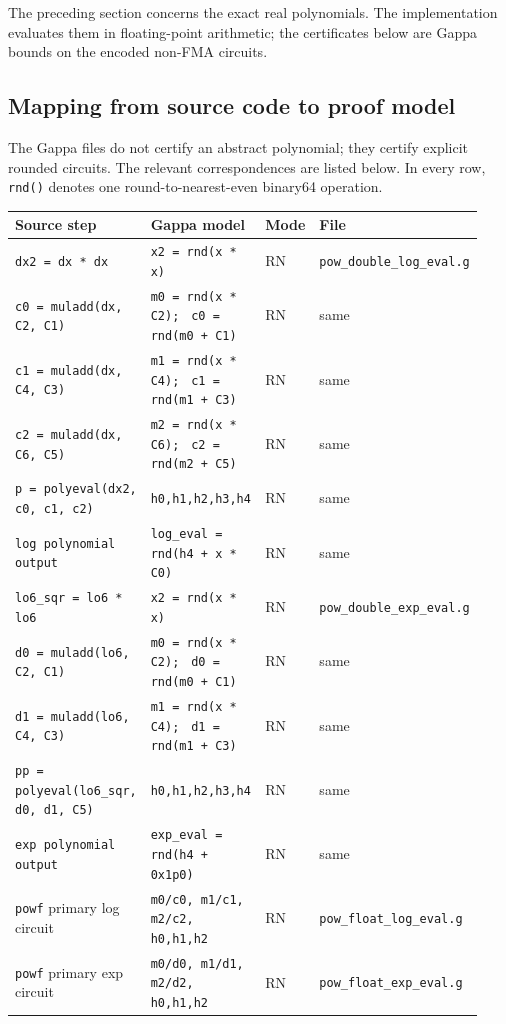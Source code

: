 \documentclass[11pt]{article}
\theoremstyle{plain}
\theoremstyle{remark}
\begin{document}
The preceding section concerns the exact real polynomials.  The implementation
evaluates them in floating-point arithmetic; the certificates below are Gappa
bounds on the encoded non-FMA circuits.

\subsection{Mapping from source code to proof model}

The Gappa files do not certify an abstract polynomial; they certify explicit
rounded circuits.  The relevant correspondences are listed below.  In every
row, \texttt{rnd()} denotes one round-to-nearest-even binary64 operation.

\begin{longtable}{@{}p{0.29\linewidth}p{0.41\linewidth}p{0.12\linewidth}p{0.11\linewidth}@{}}
\toprule
Source step & Gappa model & Mode & File \\
\midrule
\endhead
\texttt{dx2 = dx * dx}
  & \texttt{x2 = rnd(x * x)}
  & RN & \texttt{pow\_double\_log\_eval.g} \\[4pt]
\texttt{c0 = muladd(dx, C2, C1)}
  & \texttt{m0 = rnd(x * C2);} \texttt{ c0 = rnd(m0 + C1)}
  & RN & same \\[4pt]
\texttt{c1 = muladd(dx, C4, C3)}
  & \texttt{m1 = rnd(x * C4);} \texttt{ c1 = rnd(m1 + C3)}
  & RN & same \\[4pt]
\texttt{c2 = muladd(dx, C6, C5)}
  & \texttt{m2 = rnd(x * C6);} \texttt{ c2 = rnd(m2 + C5)}
  & RN & same \\[4pt]
\texttt{p = polyeval(dx2, c0, c1, c2)}
  & \texttt{h0,h1,h2,h3,h4}
  & RN & same \\[4pt]
\texttt{log polynomial output}
  & \texttt{log\_eval = rnd(h4 + x * C0)}
  & RN & same \\[8pt]

\texttt{lo6\_sqr = lo6 * lo6}
  & \texttt{x2 = rnd(x * x)}
  & RN & \texttt{pow\_double\_exp\_eval.g} \\[4pt]
\texttt{d0 = muladd(lo6, C2, C1)}
  & \texttt{m0 = rnd(x * C2);} \texttt{ d0 = rnd(m0 + C1)}
  & RN & same \\[4pt]
\texttt{d1 = muladd(lo6, C4, C3)}
  & \texttt{m1 = rnd(x * C4);} \texttt{ d1 = rnd(m1 + C3)}
  & RN & same \\[4pt]
\texttt{pp = polyeval(lo6\_sqr, d0, d1, C5)}
  & \texttt{h0,h1,h2,h3,h4}
  & RN & same \\[4pt]
\texttt{exp polynomial output}
  & \texttt{exp\_eval = rnd(h4 + 0x1p0)}
  & RN & same \\[8pt]

\texttt{powf} primary log circuit
  & \texttt{m0/c0, m1/c1, m2/c2, h0,h1,h2}
  & RN & \texttt{pow\_float\_log\_eval.g} \\[4pt]
\texttt{powf} primary exp circuit
  & \texttt{m0/d0, m1/d1, m2/d2, h0,h1,h2}
  & RN & \texttt{pow\_float\_exp\_eval.g} \\
\bottomrule
\end{longtable}
\end{document}
